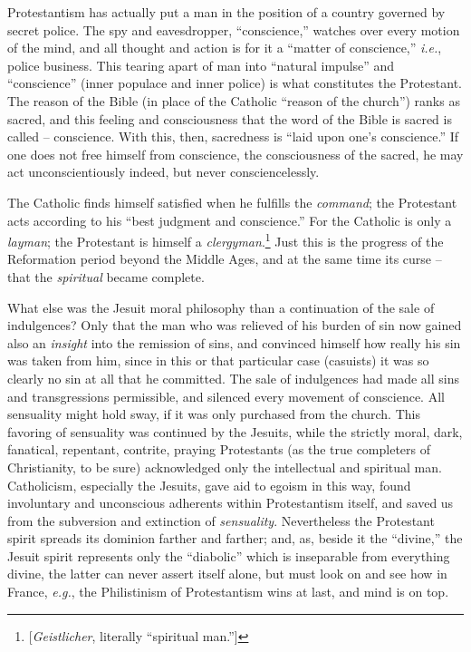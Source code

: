 \documentclass[12pt,a4paper]{book}
\begin{document}
Protestantism has actually put a man in the position of a country governed by 
secret police. The spy and eavesdropper, ``conscience,'' watches over every 
motion of the mind, and all thought and action is for it a ``matter of 
conscience,'' \textit{i.e.}, police business. This tearing apart of man into 
``natural impulse'' and ``conscience'' (inner populace and inner police) 
is what constitutes the Protestant. The reason of the Bible (in place of the 
Catholic ``reason of the church'') ranks as sacred, and this feeling and 
consciousness that the word of the Bible is sacred is called -- conscience. 
With this, then, sacredness is ``laid upon one's conscience.'' If one does 
not free himself from conscience, the consciousness of the sacred, he may act 
unconscientiously indeed, but never consciencelessly.

The Catholic finds himself satisfied when he fulfills the \textit{command}; 
the Protestant acts according to his ``best judgment and conscience.'' For 
the Catholic is only a \textit{layman}; the Protestant is himself a 
\textit{clergyman}.\footnote{[\textit{Geistlicher}, literally ``spiritual 
man.'']} Just this is the progress of the Reformation period beyond the 
Middle Ages, and at the same time its curse -- that the \textit{spiritual} 
became complete.

What else was the Jesuit moral philosophy than a continuation of the sale of 
indulgences? Only that the man who was relieved of his burden of sin now 
gained also an \textit{insight} into the remission of sins, and convinced 
himself how really his sin was taken from him, since in this or that 
particular case (casuists) it was so clearly no sin at all that he committed. 
The sale of indulgences had made all sins and transgressions permissible, and 
silenced every movement of conscience. All sensuality might hold sway, if it 
was only purchased from the church. This favoring of sensuality was continued 
by the Jesuits, while the strictly moral, dark, fanatical, repentant, 
contrite, praying Protestants (as the true completers of Christianity, to be 
sure) acknowledged only the intellectual and spiritual man. Catholicism, 
especially the Jesuits, gave aid to egoism in this way, found involuntary and 
unconscious adherents within Protestantism itself, and saved us from the 
subversion and extinction of \textit{sensuality}. Nevertheless the Protestant 
spirit spreads its dominion farther and farther; and, as, beside it the 
``divine,'' the Jesuit spirit represents only the ``diabolic'' which is 
inseparable from everything divine, the latter can never assert itself alone, 
but must look on and see how in France, \textit{e.g.}, the Philistinism of 
Protestantism wins at last, and mind is on top.
\end{document}
